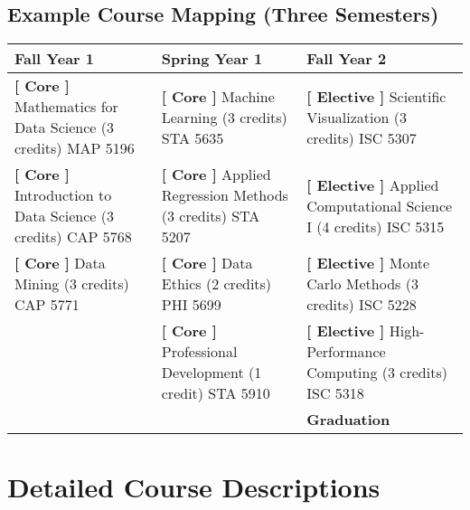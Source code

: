 \documentclass[12pt,a4paper]{article}
\begin{document}
\subsection*{Example Course Mapping (Three Semesters)}
\begin{tabular}{|p{4cm}|p{4cm}|p{4cm}|}
\hline
\textbf{Fall Year 1} & \textbf{Spring Year 1} & \textbf{Fall Year 2} \\ \hline
\textbf{[ Core ]} \newline Mathematics for Data Science (3 credits) \newline MAP 5196 & \textbf{[ Core ]} \newline Machine Learning (3 credits) \newline STA 5635 & \textbf{[ Elective ]} \newline Scientific Visualization (3 credits) \newline ISC 5307 \\
\hline
\textbf{[ Core ]} \newline Introduction to Data Science (3 credits) \newline CAP 5768 & \textbf{[ Core ]} \newline Applied Regression Methods (3 credits) \newline STA 5207 & \textbf{[ Elective ]} \newline Applied Computational Science I (4 credits) \newline ISC 5315 \\
\hline
\textbf{[ Core ]} \newline Data Mining (3 credits) \newline CAP 5771 & \textbf{[ Core ]} \newline Data Ethics (2 credits) \newline PHI 5699 & \textbf{[ Elective ]} \newline Monte Carlo Methods (3 credits) \newline ISC 5228 \\
\hline
 & \textbf{[ Core ]} \newline Professional Development (1 credit) \newline STA 5910 & \textbf{[ Elective ]} \newline High-Performance Computing (3 credits) \newline ISC 5318 \\
\hline
 &  & \textbf{Graduation} \\
\hline
\end{tabular}
\newpage

\section{Detailed Course Descriptions}
\end{document}
